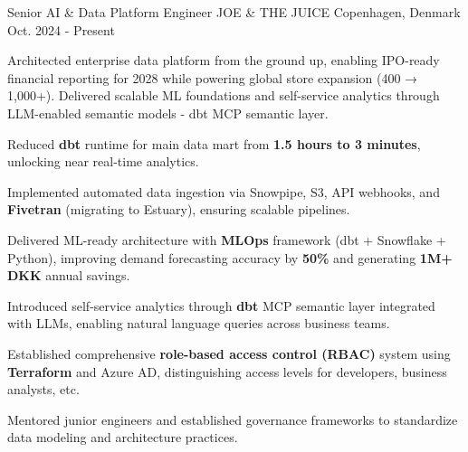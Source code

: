 

\begin{cventries}

  \cventry
    {Senior AI \& Data Platform Engineer} %
    {JOE \& THE JUICE} %
    {Copenhagen, Denmark} %
    {Oct. 2024 - Present} %
    {
      \begin{cvitems} %
        \item {Architected enterprise data platform from the ground up, enabling IPO-ready financial reporting for 2028 while powering global store expansion (400 → 1,000+). Delivered scalable ML foundations and self-service analytics through LLM-enabled semantic models - dbt MCP semantic layer.}
        \item {Reduced \textbf{dbt} runtime for main data mart from \textbf{1.5 hours to 3 minutes}, unlocking near real-time analytics.}
        \item {Implemented automated data ingestion via Snowpipe, S3, API webhooks, and \textbf{Fivetran} (migrating to Estuary), ensuring scalable pipelines.}
        \item {Delivered ML-ready architecture with \textbf{MLOps} framework (dbt + Snowflake + Python), improving demand forecasting accuracy by \textbf{50\%} and generating \textbf{1M+ DKK} annual savings.}
        \item {Introduced self-service analytics through \textbf{dbt} MCP semantic layer integrated with LLMs, enabling natural language queries across business teams.}
        \item {Established comprehensive \textbf{role-based access control (RBAC)} system using \textbf{Terraform} and Azure AD, distinguishing access levels for developers, business analysts, etc.}
        \item {Mentored junior engineers and established governance frameworks to standardize data modeling and architecture practices.}
      \end{cvitems}
    }


\end{cventries}
